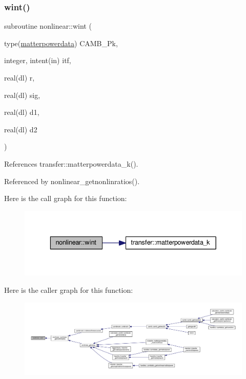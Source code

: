 \subsubsection{\texorpdfstring{wint()}{wint()}}
{\footnotesize\ttfamily subroutine nonlinear\+::wint (\begin{DoxyParamCaption}\item[{type(\mbox{\hyperlink{structtransfer_1_1matterpowerdata}{matterpowerdata}})}]{C\+A\+M\+B\+\_\+\+Pk,  }\item[{integer, intent(in)}]{itf,  }\item[{real(dl)}]{r,  }\item[{real(dl)}]{sig,  }\item[{real(dl)}]{d1,  }\item[{real(dl)}]{d2 }\end{DoxyParamCaption})\hspace{0.3cm}{\ttfamily [private]}}



References transfer\+::matterpowerdata\+\_\+k().



Referenced by nonlinear\+\_\+getnonlinratios().

Here is the call graph for this function\+:
\nopagebreak
\begin{figure}[H]
\begin{center}
\leavevmode
\includegraphics[width=336pt]{namespacenonlinear_acf30963fec3b82503de7d079f4091461_cgraph}
\end{center}
\end{figure}
Here is the caller graph for this function\+:
\nopagebreak
\begin{figure}[H]
\begin{center}
\leavevmode
\includegraphics[width=350pt]{namespacenonlinear_acf30963fec3b82503de7d079f4091461_icgraph}
\end{center}
\end{figure}
\mbox{\label{namespacenonlinear_a96a394ea7d173aec659a73ff09f548c6}} 
